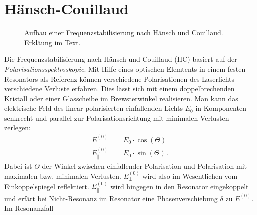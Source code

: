 \section{Hänsch-Couillaud}\label{sec:haensch-couillaud}
\begin{figure}[h]
 	\centering
	\caption[Hänsch-Couillaud - Aufbau]{Aufbau
	einer Frequenzstabilisierung nach Hänsch
	und Couillaud. Erkläung im Text.}\label{fig:haensch-couillaud_aufbau}
\end{figure}
Die Frequenzstabilisierung nach Hänsch und Couillaud (HC)
basiert auf der \textit{Polarisationsspektroskopie}. Mit Hilfe eines
optischen Elemtents in einem festen Resonators als Referenz können verschiedene
Polarisationen des Laserlichts verschiedene Verluste erfahren. Dies lässt sich
mit einem doppelbrechenden Kristall oder einer Glasscheibe im Brewsterwinkel
realisieren. Man kann das elektrische Feld des linear polarisierten einfallenden
Lichts $E_0$ in Komponenten senkrecht und parallel zur Polarisationsrichtung mit
minimalen Verlusten zerlegen:
\begin{equation}\label{eq:haensch-couillaud_01}
	\begin{split}
		E_{\perp}^{(0)} & = E_0\cdot\cos{(\Theta)}\\
		E_{\parallel}^{(0)} & = E_0\cdot\sin{(\Theta)}\,.
	\end{split}
\end{equation}
Dabei ist $\Theta$ der Winkel zwischen einfallender Polarisation und
Polarisation mit maximalen bzw. minimalen Verlusten. $E_{\perp}^{(0)}$ wird also
im Wesentlichen vom Einkoppelspiegel reflektiert. $E_{\parallel}^{(0)}$
wird hingegen in den Resonator eingekoppelt und erfärt bei Nicht-Resonanz im
Resonator eine Phasenverschiebung $\delta$ zu $E_{\perp}^{(0)}$. Im Resonanzfall
